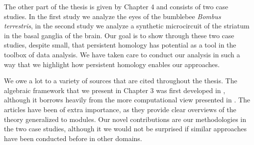 The other part of the thesis is given by Chapter 4 and consists of two case studies. In the first study we analyze the eyes of the bumblebee \textit{Bombus terrestris}, in the second study we analyze a synthetic microcircuit of the striatum in the basal ganglia of the brain. Our goal is to show through these two case studies, despite small, that persistent homology has potential as a tool in the toolbox of data analysis. We have taken care to conduct our analysis in such a way that we highlight how persistent homology enables our approaches.

We owe a lot to a variety of sources that are cited throughout the thesis. The algebraic framework that we present in Chapter 3 was first developed in \cite{Zomorodian2005}, although it borrows heavily from the more computational view presented in \cite{edelszom}. The articles \cite{vejdemo,skraba} have been of extra importance, as they provide clear overviews of the theory generalized to modules. Our novel contributions are our methodologies in the two case studies, although it we would not be surprised if similar approaches have been conducted before in other domains.


